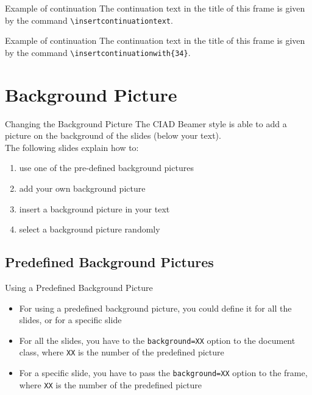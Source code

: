 \documentclass[english,sectioncirclenumberstyle]{ciadbeamer}
\begin{document}
\begin{frame}{Example of continuation \insertcontinuationtext}
	The continuation text in the title of this frame is given by the command \texttt{{\textbackslash}insertcontinuationtext}.
\end{frame}

\begin{frame}{Example of continuation }
	The continuation text in the title of this frame is given by the command \texttt{{\textbackslash}insertcontinuationwith\{34\}}.
\end{frame}


\section{Background Picture}
\sectiontableofcontentslide

\begin{frame}{Changing the Background Picture}
	The CIAD Beamer style is able to add a picture on the background of the slides (below your text). \\[.5cm]
	The following slides explain how to:
	\begin{enumerate}
		\item use one of the pre-defined background pictures
		\item add your own background picture
		\item insert a background picture in your text
		\item select a background picture randomly
	\end{enumerate}
\end{frame}

\subsection{Predefined Background Pictures}

\begin{frame}{Using a Predefined Background Picture}
	\begin{itemize}
		\item For using a predefined background picture, you could define it for all the slides, or for a specific slide \\[.5cm]
		\item For all the slides, you have to the \texttt{background=XX} option to the document class, where \texttt{XX} is the number of the predefined picture \\[.5cm]
		\item For a specific slide, you have to pass the \texttt{background=XX} option to the frame, where \texttt{XX} is the number of the predefined picture
	\end{itemize}
\end{frame}
\end{document}
